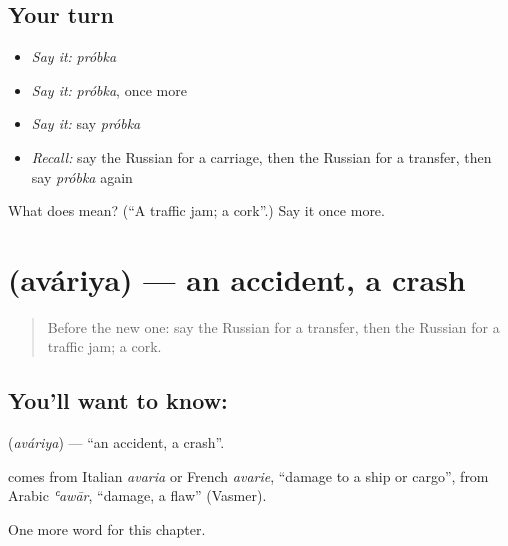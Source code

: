 \subsection*{Your turn}
\begin{itemize}
\raggedright
  \item \emph{Say it:} \emph{próbka}
  \item \emph{Say it:} \emph{próbka}, once more
  \item \emph{Say it:} say \emph{próbka}
  \item \emph{Recall:} say the Russian for a carriage, then the Russian for a transfer, then say \emph{próbka} again
\end{itemize}

\begin{tcolorbox}[breakable,colback=teal!4,colframe=teal!35!black,title={Before you move on}]
What does  mean? (\textquotedblleft{}A traffic jam; a cork\textquotedblright{}.) Say it once more.
\end{tcolorbox}
\section[\texorpdfstring{\ru{авария} (aváriya)}{авария (aváriya)}]{ (aváriya) — an accident, a crash}

\label{lesson:RU-C198-avariya}



\begin{quote}
Before the new one: say the Russian for a transfer, then the Russian for a traffic jam; a cork.
\end{quote}

\subsection*{You'll want to know: }
\textbf{} (\emph{aváriya}) — \textquotedblleft{}an accident, a crash\textquotedblright{}.

\begin{cousinweb}
\textbf{} comes from Italian \emph{avaria} or French \emph{avarie}, \textquotedblleft{}damage to a ship or cargo\textquotedblright{}, from Arabic \emph{ʿawār}, \textquotedblleft{}damage, a flaw\textquotedblright{} (Vasmer).
\end{cousinweb}

\begin{grammarlens}[title={What you've built}]
One more word for this chapter.
\end{grammarlens}

